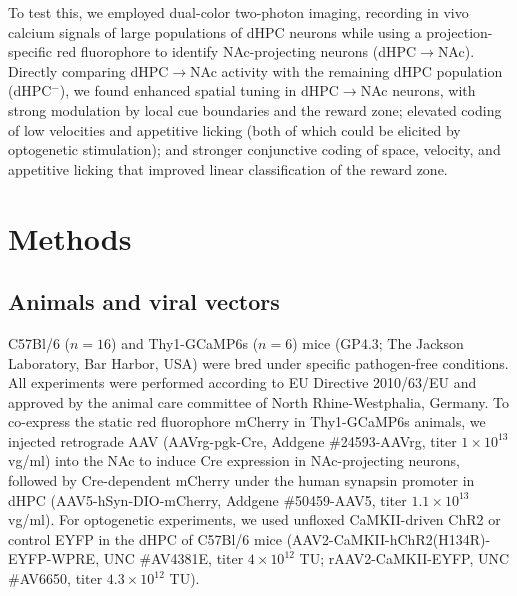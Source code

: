 \documentclass[10pt,a4paper]{article}
\begin{document}
To test this, we employed dual-color two-photon imaging, recording in vivo calcium signals of large populations of dHPC neurons while using a projection-specific red fluorophore to identify NAc-projecting neurons (dHPC$\rightarrow$NAc). Directly comparing dHPC$\rightarrow$NAc activity with the remaining dHPC population (dHPC$^{-}$), we found enhanced spatial tuning in dHPC$\rightarrow$NAc neurons, with strong modulation by local cue boundaries and the reward zone; elevated coding of low velocities and appetitive licking (both of which could be elicited by optogenetic stimulation); and stronger conjunctive coding of space, velocity, and appetitive licking that improved linear classification of the reward zone.

\section{Methods}
\subsection{Animals and viral vectors}
C57Bl/6 ($n=16$) and Thy1-GCaMP6s ($n=6$) mice (GP4.3; The Jackson Laboratory, Bar Harbor, USA) were bred under specific pathogen-free conditions. All experiments were performed according to EU Directive 2010/63/EU and approved by the animal care committee of North Rhine-Westphalia, Germany. To co-express the static red fluorophore mCherry in Thy1-GCaMP6s animals, we injected retrograde AAV (AAVrg-pgk-Cre, Addgene \#24593-AAVrg, titer $1\times10^{13}$ vg/ml) into the NAc to induce Cre expression in NAc-projecting neurons, followed by Cre-dependent mCherry under the human synapsin promoter in dHPC (AAV5-hSyn-DIO-mCherry, Addgene \#50459-AAV5, titer $1.1\times10^{13}$ vg/ml). For optogenetic experiments, we used unfloxed CaMKII-driven ChR2 or control EYFP in the dHPC of C57Bl/6 mice (AAV2-CaMKII-hChR2(H134R)-EYFP-WPRE, UNC \#AV4381E, titer $4\times10^{12}$ TU; rAAV2-CaMKII-EYFP, UNC \#AV6650, titer $4.3\times10^{12}$ TU).
\end{document}
